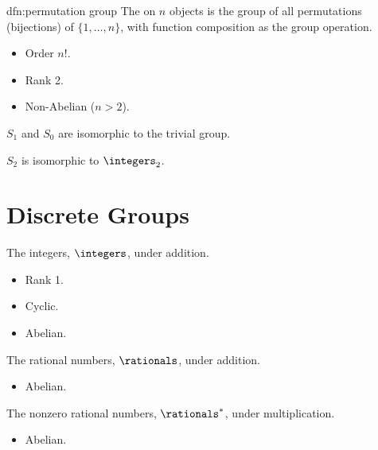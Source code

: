 \begin{dfn}{}{dfn:permutation group}
    The  on \(n\) objects is the group of all permutations (bijections) of \(\{1, \dotsc, n\}\), with function composition as the group operation.
    
    \begin{multicols}{2}
        \begin{itemize}
            \item Order \(n!\).
            \item Rank 2.
            \item Non-Abelian (\(n > 2\)).
        \end{itemize}
    \end{multicols}
    \(S_1\) and \(S_0\) are isomorphic to the trivial group.
    
    \(S_2\) is isomorphic to \(\integers_2\).
\end{dfn}

\section{Discrete Groups}

\begin{dfn}{}{}
    The integers, \(\integers\), under addition.
    
    \begin{multicols}{2}
        \begin{itemize}
            \item Rank 1.
            \item Cyclic.
            \item Abelian.
        \end{itemize}
    \end{multicols}
\end{dfn}

\begin{dfn}{}{}
    The rational numbers, \(\rationals\), under addition.
    
    \begin{multicols}{2}
        \begin{itemize}
            \item Abelian.
        \end{itemize}
    \end{multicols}
\end{dfn}

\begin{dfn}{}{}
    The nonzero rational numbers, \(\rationals^*\), under multiplication.
    
    \begin{multicols}{2}
        \begin{itemize}
            \item Abelian.
        \end{itemize}
    \end{multicols}
\end{dfn}

